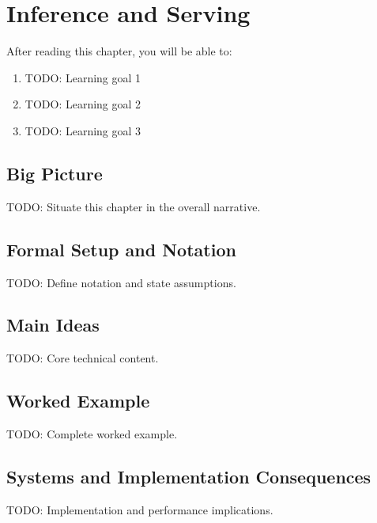 \chapter{Inference and Serving}
\label{ch:18}

\begin{keyinsight}
After reading this chapter, you will be able to:
\begin{enumerate}
  \item TODO: Learning goal 1
  \item TODO: Learning goal 2
  \item TODO: Learning goal 3
\end{enumerate}
\end{keyinsight}

\section{Big Picture}
\label{ch:18:sec:big_picture}

TODO: Situate this chapter in the overall narrative.

\section{Formal Setup and Notation}
\label{ch:18:sec:setup}

TODO: Define notation and state assumptions.

\section{Main Ideas}
\label{ch:18:sec:main}

TODO: Core technical content.

\section{Worked Example}
\label{ch:18:sec:example}

TODO: Complete worked example.

\section{Systems and Implementation Consequences}
\label{ch:18:sec:systems}

TODO: Implementation and performance implications.

